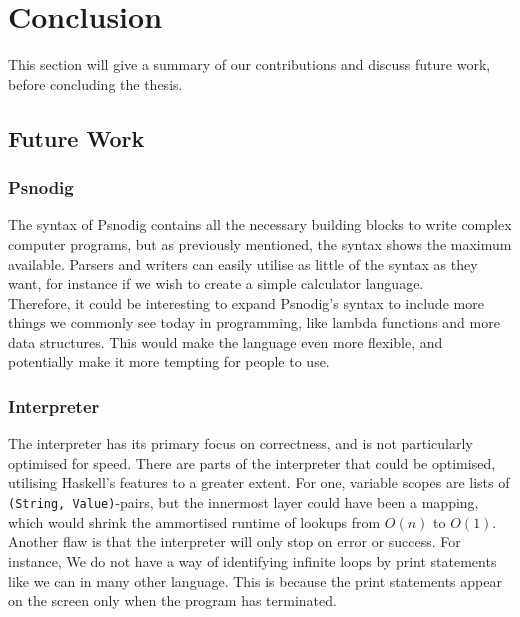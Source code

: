 \chapter{Conclusion}


This section will give a summary of our contributions and discuss future work, before concluding the thesis.

\section{Future Work}

\subsection{Psnodig}

The syntax of Psnodig contains all the necessary building blocks to write complex computer programs, but as previously mentioned, the syntax shows the maximum available. Parsers and writers can easily utilise as little of the syntax as they want, for instance if we wish to create a simple calculator language. \\

Therefore, it could be interesting to expand Psnodig's syntax to include more things we commonly see today in programming, like lambda functions and more data structures. This would make the language even more flexible, and potentially make it more tempting for people to use.

\subsection{Interpreter}

The interpreter has its primary focus on correctness, and is not particularly optimised for speed. There are parts of the interpreter that could be optimised, utilising Haskell's features to a greater extent. For one, variable scopes are lists of \texttt{(String, Value)}-pairs, but the innermost layer could have been a mapping, which would shrink the ammortised runtime of lookups from $O(n)$ to $O(1)$. \\

Another flaw is that the interpreter will only stop on error or success. For instance, We do not have a way of identifying infinite loops by print statements like we can in many other language. This is because the print statements appear on the screen only when the program has terminated.

